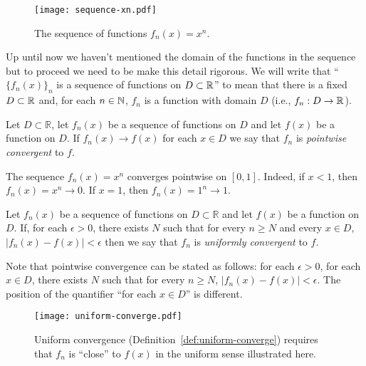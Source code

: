 \begin{figure}
  \begin{center}
    \texttt{[image: sequence-xn.pdf]}
    \caption{The sequence of functions \(f_n(x)= x^n\).}
  \end{center}
\end{figure}

\noindent
Up until now we haven't mentioned the domain of the functions in the sequence but to proceed we need to be make this detail rigorous.
We will write that ``\({\{f_n(x)\}}_{n}\) is a sequence of functions on \(D\subset \mathbb{R}\)'' to mean that there is a fixed \(D\subset \mathbb{R}\) and, for each \(n\in \mathbb{N}\), \(f_{n}\) is a function with domain \(D\) (i.e., \(f_n : D \to \mathbb{R}\)).


\begin{definition}
  Let \(D\subset \mathbb{R}\),
  let \(f_n(x)\) be a sequence of functions on \(D\)
  and let \(f(x)\) be a function on \(D\).
  If \(f_n(x) \to f(x)\) for each \(x\in D\) we say that \(f_n\) is \emph{pointwise convergent} to \(f\).
\end{definition}

\begin{example*}
  The sequence \(f_n(x) = x^n\) converges pointwise on \([0,1]\).
  Indeed, if $x < 1$, then $f_n(x) = x^n \to 0$. If $x = 1$, then $f_n(x) = 1^n \to 1$.
\end{example*}


\begin{definition}%
  \label{def:uniform-converge}
  Let \(f_n(x)\) be a sequence of functions on \(D\subset \mathbb{R}\)
  and let \(f(x)\) be a function on \(D\).
  If, for each \(\epsilon>0\), there exists \(N\) such that for every \(n\geq N\) and every \(x\in D\), \(|f_n(x) - f(x)| < \epsilon\) then we say that \(f_n\) is \emph{uniformly convergent} to \(f\).
\end{definition}
Note that pointwise convergence can be stated as follows:
for each \(\epsilon>0\), for each $x \in D$, there exists \(N\) such that for every \(n\geq N\), \(|f_n(x) - f(x)| < \epsilon\).
The position of the quantifier ``for each $x \in D$'' is different.


\begin{figure}
  \centering
  \texttt{[image: uniform-converge.pdf]}
  \caption{Uniform convergence (Definition~\ref{def:uniform-converge}) requires that \(f_n\) is ``close'' to \(f(x)\) in the uniform sense illustrated here.}%
  \label{fig:uniform-converge}
\end{figure}

